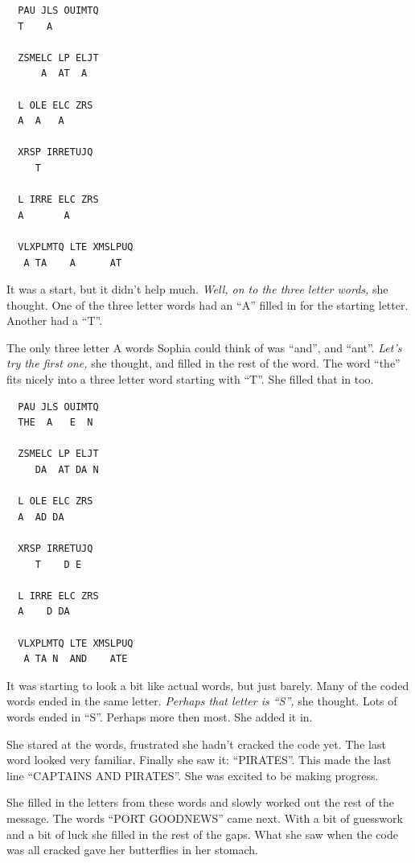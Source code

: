 \documentclass[12pt]{extbook}
\begin{document}
  \begin{lstlisting}
  PAU JLS OUIMTQ
  T    A
  
  ZSMELC LP ELJT
      A  AT  A
  
  L OLE ELC ZRS
  A  A   A
  
  XRSP IRRETUJQ
     T
  
  L IRRE ELC ZRS
  A       A
  
  VLXPLMTQ LTE XMSLPUQ
   A TA    A      AT
  \end{lstlisting}
  
  It was a start, but it didn't help much. \emph{Well, on to the three
  letter words,} she thought. One of the three letter words had an
  \enquote{A} filled in for the starting letter. Another had a
  \enquote{T}.
  
  The only three letter A words Sophia could think of was \enquote{and},
  and \enquote{ant}. \emph{Let's try the first one,} she thought, and
  filled in the rest of the word. The word \enquote{the} fits nicely into
  a three letter word starting with \enquote{T}. She filled that in too.
  
  \begin{lstlisting}
  PAU JLS OUIMTQ
  THE  A   E  N
  
  ZSMELC LP ELJT
     DA  AT DA N
  
  L OLE ELC ZRS
  A  AD DA
  
  XRSP IRRETUJQ
     T    D E
  
  L IRRE ELC ZRS
  A    D DA
  
  VLXPLMTQ LTE XMSLPUQ
   A TA N  AND    ATE
  \end{lstlisting}
  
  It was starting to look a bit like actual words, but just barely. Many
  of the coded words ended in the same letter. \emph{Perhaps that letter
  is \enquote{S},} she thought. Lots of words ended in \enquote{S}.
  Perhaps more then most. She added it in.
  
  She stared at the words, frustrated she hadn't cracked the code yet. The
  last word looked very familiar. Finally she saw it: \enquote{PIRATES}.
  This made the last line \enquote{CAPTAINS AND PIRATES}. She was excited
  to be making progress.
  
  She filled in the letters from these words and slowly worked out the
  rest of the message. The words \enquote{PORT GOODNEWS} came next. With a
  bit of guesswork and a bit of luck she filled in the rest of the gaps.
  What she saw when the code was all cracked gave her butterflies in her
  stomach.
  
\end{document}
